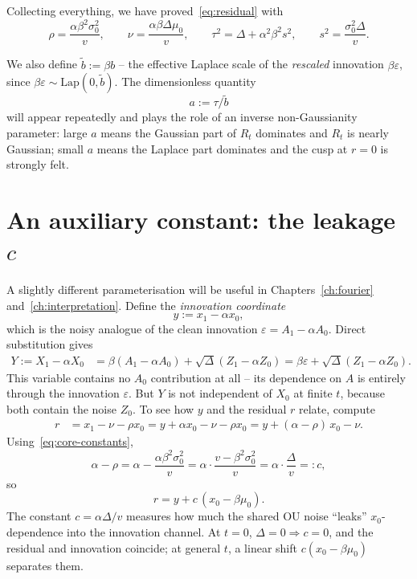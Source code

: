 \documentclass[11pt,a4paper,openany]{book}
\theoremstyle{plainserif}
\theoremstyle{definition}
\theoremstyle{remarkstyle}
\newcommand{\Lap}{\mathrm{Lap}}
\newcommand{\btilde}{\tilde{b}}
\begin{document}
Collecting everything, we have proved~\eqref{eq:residual} with
\begin{equation}
\boxed{\;\rho = \dfrac{\alpha\beta^2\sigma_0^2}{v},\qquad
       \nu  = \dfrac{\alpha\beta\Delta\mu_0}{v},\qquad
       \tau^2 = \Delta + \alpha^2\beta^2 s^2,\qquad
       s^2 = \dfrac{\sigma_0^2\Delta}{v}.\;}
\label{eq:core-constants}
\end{equation}

We also define $\btilde := \beta b$ -- the effective Laplace scale of the
\emph{rescaled} innovation $\beta\varepsilon$, since $\beta\varepsilon \sim \Lap(0,\btilde)$.
The dimensionless quantity
\begin{equation}
a := \tau / \btilde
\label{eq:a-def}
\end{equation}
will appear repeatedly and plays the role of an inverse
non-Gaussianity parameter: large $a$ means the Gaussian part of $R_t$
dominates and $R_t$ is nearly Gaussian; small $a$ means the Laplace
part dominates and the cusp at $r=0$ is strongly felt.

\section{An auxiliary constant: the leakage $c$}

A slightly different parameterisation will be useful in Chapters~\ref{ch:fourier}
and~\ref{ch:interpretation}. Define the \emph{innovation coordinate}
\begin{equation}
y := x_1 - \alpha x_0,
\end{equation}
which is the noisy analogue of the clean innovation
$\varepsilon = A_1 - \alpha A_0$. Direct substitution gives
\begin{align}
Y := X_1 - \alpha X_0
 &= \beta(A_1 - \alpha A_0) + \sqrt{\Delta}(Z_1 - \alpha Z_0)
 = \beta\varepsilon + \sqrt{\Delta}(Z_1 - \alpha Z_0).
\label{eq:innovation-coord}
\end{align}
This variable contains no $A_0$ contribution at all -- its dependence on
$A$ is entirely through the innovation $\varepsilon$. But $Y$ is not
independent of $X_0$ at finite $t$, because both contain the noise $Z_0$.
To see how $y$ and the residual $r$ relate, compute
\begin{align}
r &= x_1 - \nu - \rho x_0 = y + \alpha x_0 - \nu - \rho x_0
   = y + (\alpha - \rho)\,x_0 - \nu.
\end{align}
Using~\eqref{eq:core-constants},
\begin{equation}
\alpha - \rho = \alpha - \frac{\alpha\beta^2\sigma_0^2}{v}
              = \alpha\cdot \frac{v - \beta^2\sigma_0^2}{v}
              = \alpha\cdot \frac{\Delta}{v} =: c,
\label{eq:c-def}
\end{equation}
so
\begin{equation}
r = y + c\,(x_0 - \beta\mu_0).
\label{eq:r-in-terms-of-y}
\end{equation}
The constant $c = \alpha\Delta/v$ measures how much the shared OU noise
``leaks'' $x_0$-dependence into the innovation channel. At $t=0$,
$\Delta = 0 \Rightarrow c = 0$, and the residual and innovation coincide;
at general $t$, a linear shift $c(x_0 - \beta\mu_0)$ separates them.
\end{document}
